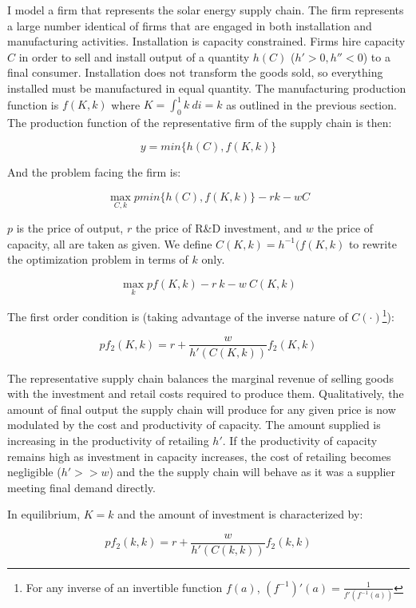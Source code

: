 \documentclass{article}
\begin{document}
I model a firm that represents the solar energy supply chain. The firm represents a large number identical of firms that are engaged in both installation and manufacturing activities. Installation is capacity constrained. Firms hire capacity $C$ in order to sell and install output of a quantity $h(C)$ ($h'>0, h''<0$)  to a final consumer. Installation does not transform the goods sold, so everything installed must be manufactured in equal quantity. The manufacturing production function is $f(K,k)$ where $K = \int_0^1 k ~ di = k$ as outlined in the previous section. The production function of the representative firm of the supply chain is then:

\[
y = min\{h(C), f(K,k)\}
\]

And the problem facing the firm is:

\[
\max_{C,k} p min\{h(C), f(K,k)\} - r k - w C
\]

$p$ is the price of output, $r$ the price of R\&D investment, and $w$ the price of capacity, all are taken as given. We define $C(K,k) = h^{-1} (f(K,k)$ to rewrite the optimization problem in terms of $k$ only.

\begin{equation}
\max_{k} p f(K,k) - r\:k - w\:C(K,k)
\end{equation}

The first order condition is (taking advantage of the inverse nature of $C(\cdot)$\footnote{ For any inverse of an invertible function $f(a)$, $(f^{-1})'(a) = \frac{1}{f'(f^{-1}(a))}$}):

\[
p f_2(K,k) = r + \frac{w}{h'(C(K,k))} f_2 (K,k)
\]

The representative supply chain balances the marginal revenue of selling goods with the investment and retail costs required to produce them. Qualitatively, the amount of final output the supply chain will produce for any given price is now modulated by the cost and productivity of capacity. The amount supplied is increasing in the productivity of retailing $h'$. If the productivity of capacity remains high as investment in capacity increases, the cost of retailing becomes negligible (\(h' >> w\)) and the the supply chain will behave as it was a supplier meeting final demand directly.

 In equilibrium, $K=k$ and the amount of investment is characterized by:

\begin{equation}
p f_2(k,k) = r + \frac{w}{h'(C(k,k))} f_2 (k,k)
\label{eq_FOC}
\end{equation}
\end{document}
